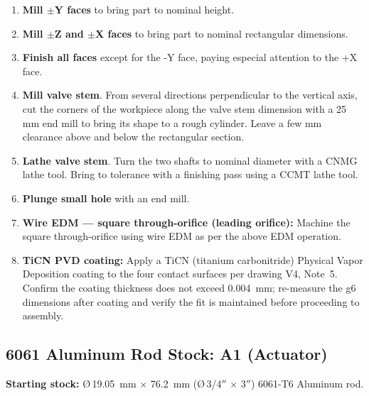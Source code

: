 \documentclass[12pt, letterpaper]{report}%
\newcounter{mycounter}           %
\newcounter{sub}[mycounter]      %
\begin{document}
\begin{appendices}
	\begin{enumerate}[itemsep=4pt]
		\item \textbf{Mill $\pm$Y faces} to bring part to nominal height.
		\item \textbf{Mill $\pm$Z and $\pm$X faces} to bring part to nominal rectangular
					dimensions.
		\item \textbf{Finish all faces} except for the -Y face, paying especial attention
					to the +X face.
		\item \textbf{Mill valve stem}. From several directions perpendicular to the vertical axis,
					cut the corners of the workpiece along the valve stem dimension with a 25 mm end mill
					to bring its shape to a rough cylinder.
					Leave a few mm clearance above and below the rectangular section.
		\item \textbf{Lathe valve stem}. Turn the two shafts to nominal diameter with a CNMG lathe tool.
					Bring to tolerance with a finishing pass using a CCMT lathe tool.
		\item \textbf{Plunge small hole} with an end mill.
		\item \textbf{Wire EDM --- square through-orifice (leading orifice):}
					Machine the square through-orifice using wire EDM as per the above EDM operation.
		\item \textbf{TiCN PVD coating:} Apply a TiCN (titanium carbonitride) Physical Vapor
					Deposition coating to the four contact surfaces per drawing V4, Note~5.
					Confirm the coating thickness does not exceed \SI{0.004}{\milli\meter};
					re-measure the g6 dimensions after coating and verify the fit is maintained
					before proceeding to assembly.
	\end{enumerate}

	\subsection{6061 Aluminum Rod Stock: A1 (Actuator)}
	\label{sec:mfg:A1}

	\textbf{Starting stock:}
	\O\,\SI{19.05}{\milli\meter} $\times$ \SI{76.2}{\milli\meter}
	(\O\,3/4$''$ $\times$ 3$''$) 6061-T6 Aluminum rod.


\end{appendices}
\end{document}
